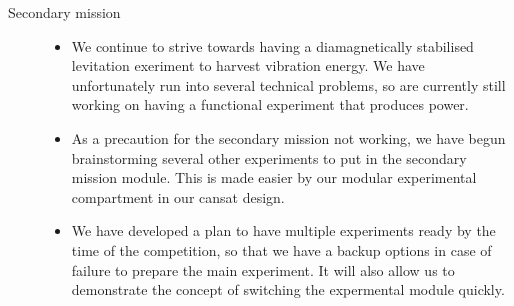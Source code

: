 \documentclass{report}
\begin{document}
\begin{description}
		\item[Secondary mission] \hfill \begin{itemize}
			\item We continue to strive towards having a diamagnetically 
			stabilised levitation exeriment to harvest vibration energy. We have
			unfortunately run into several technical problems, so are currently
			still working on having a functional experiment that produces power.
			\item As a precaution for the secondary mission not working, we 
			have begun brainstorming several other experiments to put in the
			secondary mission module. This is made easier by our modular
			experimental compartment in our cansat design.
			\item We have developed a plan to have multiple experiments ready
			by the time of the competition, so that we have a backup options
			in case of failure to prepare the main experiment. It will also allow
			us to demonstrate the concept of switching the expermental module 
			quickly.
		\end{itemize}

	\end{description}
		
\end{document}
